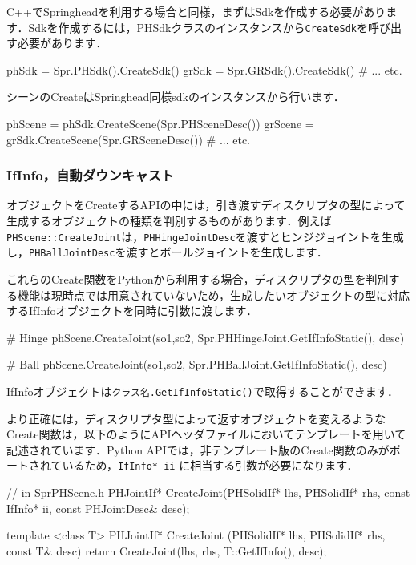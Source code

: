 C++\KLUDGE でSpringhead\KLUDGE を利用する場合と同様，まずはSdk\KLUDGE を作成する必要があります．Sdk\KLUDGE を作成するには，PHSdk\KLUDGE クラスのインスタンスから\texttt{CreateSdk}\KLUDGE を呼び出す必要があります．
\begin{sourcecode}
phSdk = Spr.PHSdk().CreateSdk()
grSdk = Spr.GRSdk().CreateSdk()
# ... etc.
\end{sourcecode}

\KLUDGE シーンのCreate\KLUDGE はSpringhead\KLUDGE 同様sdk\KLUDGE のインスタンスから行います．
\begin{sourcecode}
phScene = phSdk.CreateScene(Spr.PHSceneDesc())
grScene = grSdk.CreateScene(Spr.GRSceneDesc())
# ... etc.
\end{sourcecode}

\subsubsection*{IfInfo\KLUDGE ，自動ダウンキャスト}

\KLUDGE オブジェクトをCreate\KLUDGE するAPI\KLUDGE の中には，引き渡すディスクリプタの型によって生成するオブジェクトの種類を判別するものがあります．例えば\texttt{PHScene::CreateJoint}\KLUDGE は，\texttt{PHHingeJointDesc}\KLUDGE を渡すとヒンジジョイントを生成し，\texttt{PHBallJointDesc}\KLUDGE を渡すとボールジョイントを生成します．

\KLUDGE これらのCreate\KLUDGE 関数をPython\KLUDGE から利用する場合，ディスクリプタの型を判別する機能は現時点では用意されていないため，生成したいオブジェクトの型に対応するIfInfo\KLUDGE オブジェクトを同時に引数に渡します．
\begin{sourcecode}
# Hinge
phScene.CreateJoint(so1,so2, Spr.PHHingeJoint.GetIfInfoStatic(), desc)

# Ball
phScene.CreateJoint(so1,so2, Spr.PHBallJoint.GetIfInfoStatic(),  desc)
\end{sourcecode} 
IfInfo\KLUDGE オブジェクトは\texttt{\KLUDGE クラス名.GetIfInfoStatic()}\KLUDGE で取得することができます．

\KLUDGE より正確には，ディスクリプタ型によって返すオブジェクトを変えるようなCreate\KLUDGE 関数は，以下のようにAPI\KLUDGE ヘッダファイルにおいてテンプレートを用いて記述されています．Python API\KLUDGE では，非テンプレート版のCreate\KLUDGE 関数のみがポートされているため，\texttt{IfInfo* ii} \KLUDGE に相当する引数が必要になります．
\begin{sourcecode}
// in SprPHScene.h
PHJointIf* CreateJoint(PHSolidIf* lhs, PHSolidIf* rhs,
  const IfInfo* ii, const PHJointDesc& desc);

template <class T> PHJointIf* CreateJoint
(PHSolidIf* lhs, PHSolidIf* rhs, const T& desc){
  return CreateJoint(lhs, rhs, T::GetIfInfo(), desc);
}
\end{sourcecode}

